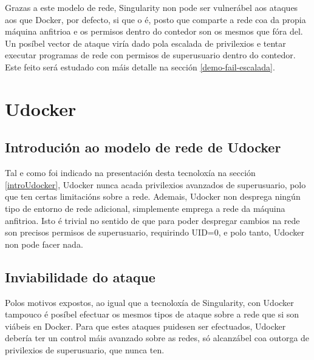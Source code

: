 Grazas a este modelo de rede, Singularity non pode ser vulnerábel aos ataques aos que Docker, por defecto, si que o é, posto que comparte a rede coa da propia máquina anfitrioa e os permisos dentro do contedor son os mesmos que fóra del.\\

Un posíbel vector de ataque viría dado pola escalada de privilexios e tentar executar programas de rede con permisos de superusuario dentro do contedor. Este feito será estudado con máis detalle na sección \ref{demo-fail-escalada}.

\section{Udocker}

\subsection{Introdución ao modelo de rede de Udocker}

Tal e como foi indicado na presentación desta tecnoloxía na sección \ref{introUdocker}, Udocker nunca acada privilexios avanzados de superusuario, polo que ten certas limitacións sobre a rede. Ademais, Udocker non desprega ningún tipo de entorno de rede adicional, simplemente emprega a rede da máquina anfitrioa. Isto é trivial no sentido de que para poder despregar cambios na rede son precisos permisos de superusuario, requirindo UID=0, e polo tanto, Udocker non pode facer nada.

\subsection{Inviabilidade do ataque}

Polos motivos expostos, ao igual que a tecnoloxía de Singularity, con Udocker tampouco é posíbel efectuar os mesmos tipos de ataque sobre a rede que si son viábeis en Docker. Para que estes ataques puidesen ser efectuados, Udocker debería ter un control máis avanzado sobre as redes, só alcanzábel coa outorga de privilexios de superusuario, que nunca ten.
